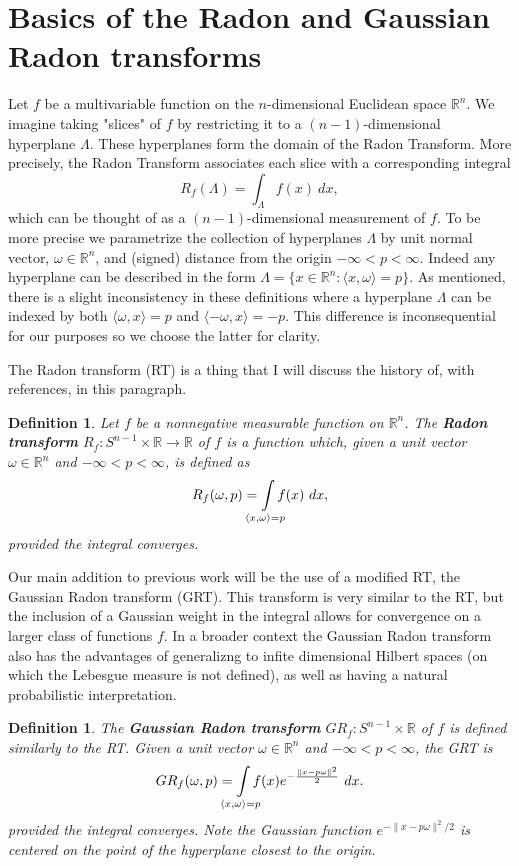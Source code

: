 \documentclass{amsart}
\newtheorem{definition}[theorem]{Definition}
\theoremstyle{remark}
\numberwithin{equation}{section}
\newcommand{\RR}{\mathbb{R}}
\def\mclimits_#1{\limits_{\mathclap{#1}}}
\begin{document}
\newpage
\section{Basics of the Radon and Gaussian Radon transforms}

Let $f$ be a multivariable function on the $n$-dimensional Euclidean space $\RR^n$. We imagine taking "slices" of $f$ by restricting it to a $(n-1)$-dimensional hyperplane $\Lambda$. These hyperplanes form the domain of the Radon Transform. More precisely, the Radon Transform associates each slice with a corresponding integral
\[
    R_f(\Lambda) = \int_{\Lambda} f(x) ~dx,
\]
which can be thought of as a $(n-1)$-dimensional measurement of $f$. To be more precise we parametrize the collection of hyperplanes $\Lambda$ by unit normal vector, $\omega \in \RR^n$, and (signed) distance from the origin $-\infty < p < \infty$. Indeed any hyperplane can be described in the form $\Lambda = \{x \in \RR^n: \langle x, \omega\rangle = p\}$. As mentioned, there is a slight inconsistency in these definitions where a hyperplane $\Lambda$ can be indexed by both $\langle \omega, x \rangle = p$ and $\langle -\omega, x \rangle = -p$. This difference is inconsequential for our purposes so we choose the latter for clarity.

The Radon transform (RT) is a thing that I will discuss the history of, with references, in this paragraph.

\begin{definition}
    Let $f$ be a nonnegative measurable function on $\mathbb{R}^n$. The \textbf{Radon transform} $R_f : S^{n-1} \times \RR \rightarrow \RR$ of $f$ is a function which, given a unit vector $\omega \in \RR^n$ and $-\infty < p < \infty$, is defined as
    \[
        R_f(\omega, p) = \int\mclimits_{\langle x, \omega \rangle = p} f(x) ~dx,
    \]
    provided the integral converges.
\end{definition}

Our main addition to previous work will be the use of a modified RT, the Gaussian Radon transform (GRT). This transform is very similar to the RT, but the inclusion of a Gaussian weight in the integral allows for convergence on a larger class of functions $f$. In a broader context the Gaussian Radon transform also has the advantages of generalizng to infite dimensional Hilbert spaces (on which the Lebesgue measure is not defined), as well as having a natural probabilistic interpretation.

\begin{definition}
The \textbf{Gaussian Radon transform} $GR_f : S^{n-1} \times \RR$ of $f$ is defined similarly to the RT. Given a unit vector $\omega \in \RR^n$ and $-\infty < p < \infty$, the GRT is
\[
    GR_f(\omega, p) = 
    \int\mclimits_{\langle x, \omega \rangle = p} f(x) e^{-\frac{\|x - p\omega\|^2} 2} ~dx.
\]
provided the integral converges. Note the Gaussian function $e^{-\|x - p\omega\|^2/2}$ is centered on the point of the hyperplane closest to the origin.
\end{definition}
\end{document}
